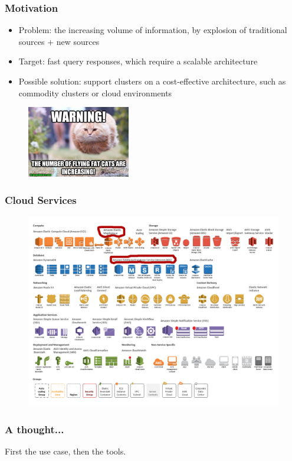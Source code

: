 \documentclass[hyperref={pdfpagelabels=true}]{beamer}
\begin{document}
\begin{frame}
\frametitle{Motivation}
  \begin{itemize}
  \item<1->Problem: the increasing volume of information, by explosion of traditional sources + new sources
  \item<1->Target: fast query responses, which require a scalable architecture
  \item<1->Possible solution: support clusters on a cost-effective architecture, such as commodity clusters or cloud environments
\end{itemize}  
      \begin{figure}  
	\includegraphics[width=0.4\textwidth]{flying_cat.jpg}
       \end{figure}  
\end{frame}

\begin{frame}
\frametitle{Cloud Services}
    \begin{figure}  
      \includegraphics[width=\textwidth]{cloud_aws1.png}
      \end{figure}  
\end{frame}

\begin{frame}
\frametitle{A thought...}
\huge{
First the use case, then the tools.
}
\end{frame}
\end{document}

